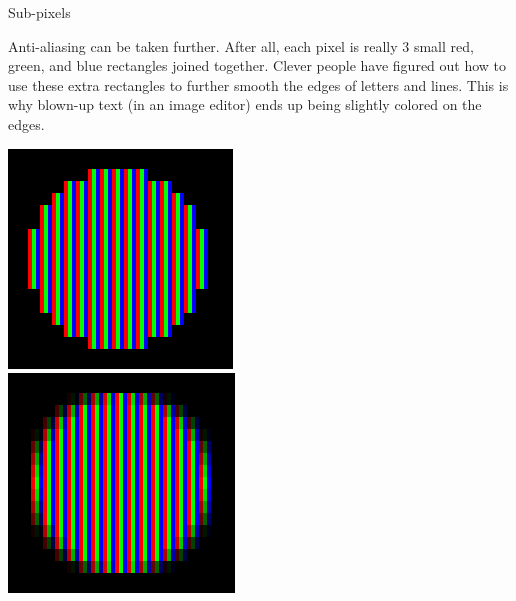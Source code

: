 \documentclass{lug}
\newcommand{\splitslide}[4]{
    \noindent
    \begin{minipage}{#1 \textwidth - #2 }
        #3
    \end{minipage}%
    \hspace{ \dimexpr #2 * 2 \relax }%
    \begin{minipage}{\textwidth - #1 \textwidth - #2 }
        #4
    \end{minipage}
}
\begin{document}
\begin{frame}{Sub-pixels}
    \splitslide{0.65}{.7em}{
        \small

        Anti-aliasing can be taken further. After all, each pixel is really 3
        small red, green, and blue rectangles joined together. Clever people
        have figured out how to use these extra rectangles to further smooth
        the edges of letters and lines. This is why blown-up text (in an image
        editor) ends up being slightly colored on the edges.

    }{
        \includegraphics[width=\textwidth]{graphics/pixel_circle} \\
        \includegraphics[width=\textwidth]{graphics/subpixel_circle}
    }
\end{frame}
\end{document}
